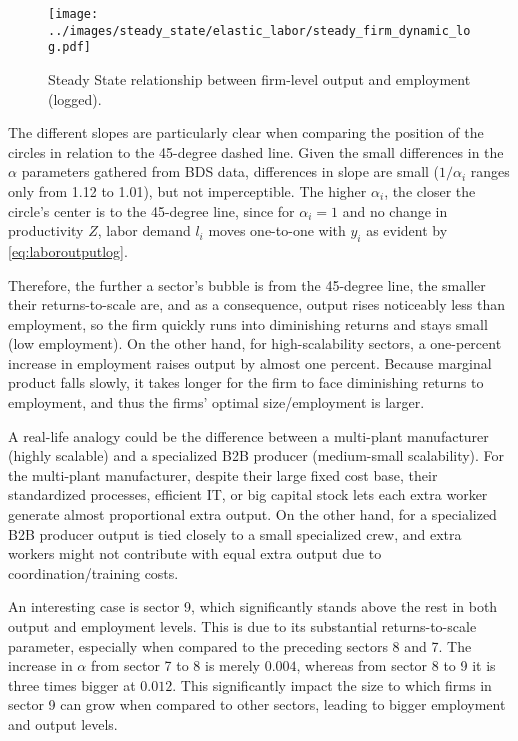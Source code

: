 \documentclass[a4paper,12pt]{article} %
\numberwithin{equation}{section} %
\numberwithin{figure}{section}
\numberwithin{table}{section}
\begin{document}
\begin{figure}[H]
  \centering
  \texttt{[image: ../images/steady\_state/elastic\_labor/steady\_firm\_dynamic\_log.pdf]}
  \caption{Steady State relationship between firm-level output and employment (logged).}
  \label{fig:steady-output-log}
\end{figure}

The different slopes are particularly clear when comparing the position of the circles in relation to the 45-degree dashed line. 
Given the small differences in the $\alpha$ parameters gathered from BDS data, differences in slope are small ($1/\alpha_i$ ranges 
only from 1.12 to 1.01), but not imperceptible. The higher $\alpha_i$, the closer the circle's center is to the 45-degree line, since 
for $\alpha_i = 1$ and no change in productivity $Z$, labor demand $l_i$ moves one-to-one with $y_i$ as evident by \eqref{eq:laboroutputlog}.

Therefore, the further a sector's bubble is from the 45-degree line, the smaller their returns-to-scale are, and as a consequence, output
rises noticeably less than employment, so the firm quickly runs into diminishing returns and stays small (low employment). On the other hand, 
for high-scalability sectors, a one-percent increase in employment raises output by almost one percent. Because marginal product falls slowly,
it takes longer for the firm to face diminishing returns to employment, and thus the firms' optimal size/employment is larger.

A real-life analogy could be the difference between a multi-plant manufacturer (highly scalable) and a specialized B2B producer 
(medium-small scalability). For the multi-plant manufacturer, despite their large fixed cost base, their standardized processes, efficient IT, 
or big capital stock lets each extra worker generate almost proportional extra output. On the other hand, for a specialized B2B producer output
is tied closely to a small specialized crew, and extra workers might not contribute with equal extra output due to coordination/training costs.

An interesting case is sector 9, which significantly stands above the rest in both output and employment levels. This is due to its substantial
returns-to-scale parameter, especially when compared to the preceding sectors 8 and 7. The increase in $\alpha$ from sector 7 to 8 
is merely $0.004$, whereas from sector 8 to 9 it is three times bigger at $0.012$. This significantly impact the size to which firms in 
sector 9 can grow when compared to other sectors, leading to bigger employment and output levels.
\end{document}
